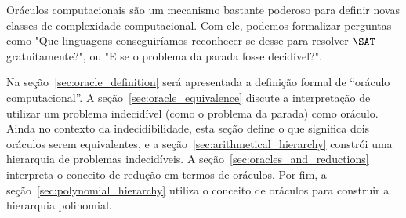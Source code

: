 Oráculos computacionais são um mecanismo bastante poderoso
para definir novas classes de complexidade computacional.
Com ele,
podemos formalizar perguntas como
"Que linguagens conseguiríamos reconhecer
se desse para resolver $\SAT$ gratuitamente?",
ou "E se o problema da parada fosse decidível?".

Na seção~\ref{sec:oracle_definition} será apresentada a definição formal
de ``oráculo computacional''.
A seção~\ref{sec:oracle_equivalence}
discute a interpretação de utilizar um problema indecidível
(como o problema da parada)
como oráculo.
Ainda no contexto da indecidibilidade,
esta seção define o que significa dois oráculos serem equivalentes,
e a seção~\ref{sec:arithmetical_hierarchy}
constrói uma hierarquia de problemas indecidíveis.
A seção~\ref{sec:oracles_and_reductions}
interpreta o conceito de redução em termos de oráculos.
Por fim, a seção~\ref{sec:polynomial_hierarchy}
utiliza o conceito de oráculos para construir a hierarquia polinomial.
